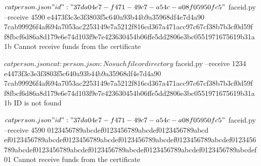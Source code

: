 \begin{myverbbox}[\small]{\output}
$ cat person.json
{"id": "37da04e7-f471-49c7-a54c-a08f05950fc5"}
$ faceid.py --receive 4590 e4473f3c3e3f3803f5c640a93b44b9a35968df4e7d4a90
7cab99926f4af694a7053ac2253149e7a5212f816cd367a471acc97c67cf38b7b3cf0d59f
f8fbcf6d86a8d179e6e74d103f9e7e423630454b06ffe5dd2806e3bc0551971675619b31a
1b
Cannot receive funds from the certificate
\end{myverbbox}

\begin{myverbbox}[\small]{\output}
$ cat person.json
cat: person.json: No such file or directory
$ faceid.py --receive 1234 e4473f3c3e3f3803f5c640a93b44b9a35968df4e7d4a90
7cab99926f4af694a7053ac2253149e7a5212f816cd367a471acc97c67cf38b7b3cf0d59f
f8fbcf6d86a8d179e6e74d103f9e7e423630454b06ffe5dd2806e3bc0551971675619b31a
1b
ID is not found
\end{myverbbox}

\begin{myverbbox}[\small]{\output}
$ cat person.json
{"id": "37da04e7-f471-49c7-a54c-a08f05950fc5"}
$ faceid.py --receive 4590 0123456789abcdef0123456789abcdef0123456789abcd
ef0123456789abcdef0123456789abcdef0123456789abcdef0123456789abcdef0123456
789abcdef0123456789abcdef0123456789abcdef0123456789abcdef0123456789abcdef
01
Cannot receive funds from the certificate
\end{myverbbox}


